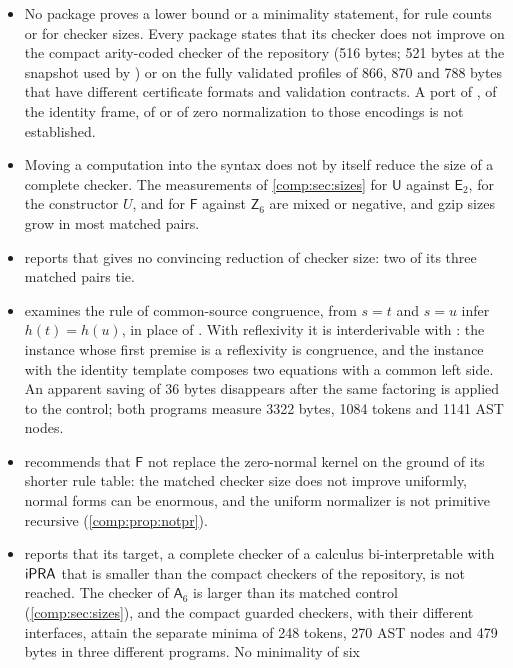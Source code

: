 \begin{itemize}
\item No package proves a lower bound or a minimality statement, for rule
 counts or for checker sizes. Every package states that its checker does not
 improve on the compact arity-coded checker of the repository (516 bytes;
 521 bytes at the snapshot used by ) or on the fully
 validated profiles of 866, 870 and 788 bytes that have different
 certificate formats and validation contracts. A port of
 , of the identity frame, of  or of zero
 normalization to those encodings is not established.
\item Moving a computation into the syntax does not by itself reduce the
 size of a complete checker. The measurements of \cref{comp:sec:sizes} for
 $\mathsf{U}$ against $\mathsf{E}_2$, for the constructor $U$, and for
 $\mathsf{F}$ against $\mathsf{Z}_6$ are mixed or negative, and gzip sizes
 grow in most matched pairs.
\item {} reports that  gives no
 convincing reduction of checker size: two of its three matched pairs tie.
\item {} examines the rule of common-source congruence,
 from $s=t$ and $s=u$ infer $h(t)=h(u)$, in place of . With
 reflexivity it is interderivable with : the instance whose
 first premise is a reflexivity is congruence, and the instance with the
 identity template composes two equations with a common left side. An
 apparent saving of 36 bytes
 disappears after the same factoring is applied to the control; both
 programs measure 3322 bytes, 1084 tokens and 1141 AST nodes.
\item {} recommends that $\mathsf{F}$ not replace
 the zero-normal kernel on the ground of its shorter rule table: the
 matched checker size does not improve uniformly, normal forms can be
 enormous, and the uniform normalizer is not primitive recursive
 (\cref{comp:prop:notpr}).
\item {} reports that its target, a complete
 checker of a calculus bi-interpretable with $\mathsf{iPRA}$ that is smaller than
 the compact checkers of the repository, is not reached. The checker of
 $\mathsf{A}_6$ is larger than its matched control
 (\cref{comp:sec:sizes}), and the compact guarded checkers, with their
 different interfaces, attain the separate minima of 248 tokens, 270 AST
 nodes and 479 bytes in three different programs. No minimality of six

\end{itemize}

